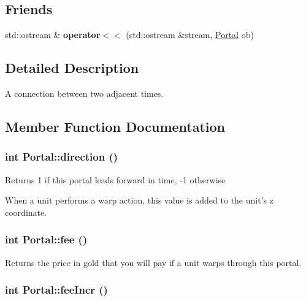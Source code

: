 \subsection*{Friends}
\begin{CompactItemize}
\item 
\hypertarget{classPortal_07fc70fa1bb4b5f274467b9c5c2bd099}{
std::ostream \& \textbf{operator$<$$<$} (std::ostream \&stream, \hyperlink{classPortal}{Portal} ob)}
\label{classPortal_07fc70fa1bb4b5f274467b9c5c2bd099}

\end{CompactItemize}


\subsection{Detailed Description}
A connection between two adjacent times. 

\subsection{Member Function Documentation}
\hypertarget{classPortal_07b79572705192e018631324017cfad7}{
\subsubsection[{direction}]{\setlength{\rightskip}{0pt plus 5cm}int Portal::direction ()}}
\label{classPortal_07b79572705192e018631324017cfad7}


Returns 1 if this portal leads forward in time, -1 otherwise

When a unit performs a warp action, this value is added to the unit's z coordinate. \hypertarget{classPortal_9b8b1eef151f135157295e00b09fe9c5}{
\subsubsection[{fee}]{\setlength{\rightskip}{0pt plus 5cm}int Portal::fee ()}}
\label{classPortal_9b8b1eef151f135157295e00b09fe9c5}


Returns the price in gold that you will pay if a unit warps through this portal. \hypertarget{classPortal_3ef4c98143afeb453f17d6aba763ad1d}{
\subsubsection[{feeIncr}]{\setlength{\rightskip}{0pt plus 5cm}int Portal::feeIncr ()}}
\label{classPortal_3ef4c98143afeb453f17d6aba763ad1d}


